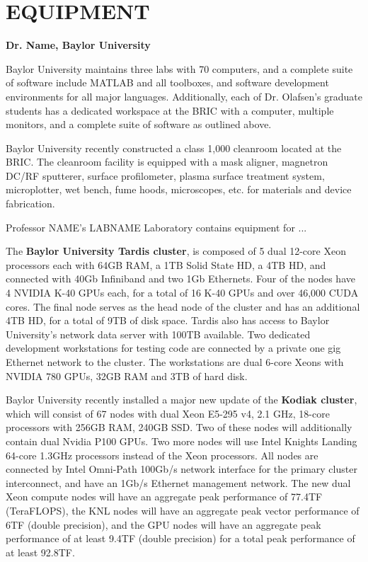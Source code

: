 \section*{EQUIPMENT}



\noindent\textbf{Dr. Name, Baylor University}

Baylor University maintains three labs with 70 computers, and a complete suite of software include MATLAB and all toolboxes, and software development environments for all major languages.  Additionally, each of Dr. Olafsen's graduate students has a dedicated workspace at the BRIC with a computer, multiple monitors, and a complete suite of software as outlined above.

Baylor University recently constructed a class 1,000 cleanroom located at the BRIC.  The cleanroom facility is equipped with a mask aligner, magnetron DC/RF sputterer, surface profilometer, plasma surface treatment system, microplotter, wet bench, fume hoods, microscopes, etc. for materials and device fabrication.

Professor NAME's LABNAME Laboratory contains equipment for ...


The \textbf{Baylor University Tardis cluster}, is composed of 5 dual 12-core Xeon processors each with 64GB RAM, a 1TB Solid State HD, a 4TB HD, and connected with 40Gb Infiniband and two 1Gb Ethernets. Four of the nodes have 4 NVIDIA K-40 GPUs each, for a total of 16 K-40 GPUs and over 46,000 CUDA cores. The final node serves as the head node of the cluster and has an additional 4TB HD, for a total of 9TB of disk space. Tardis also has access to Baylor University's network data server with 100TB available.  Two dedicated development workstations for testing code are connected by a private one gig Ethernet network to the cluster. The workstations are dual 6-core Xeons with NVIDIA 780 GPUs, 32GB RAM and 3TB of hard disk.

Baylor University recently installed a major new update of the \textbf{Kodiak cluster}, which will consist of 67 nodes with dual Xeon E5-295 v4, 2.1 GHz, 18-core processors with 256GB RAM, 240GB SSD.  Two of these nodes will additionally contain dual Nvidia P100 GPUs.  Two more nodes will use Intel Knights Landing 64-core 1.3GHz processors instead of the Xeon processors.  All nodes are connected by Intel Omni-Path 100Gb/s network interface for the primary cluster interconnect, and have an 1Gb/s Ethernet management network.   The new dual Xeon compute nodes will have an aggregate peak performance of 77.4TF (TeraFLOPS), the KNL nodes will have an aggregate peak vector performance of 6TF (double precision), and the GPU nodes will have an aggregate peak performance of at least 9.4TF (double precision) for a total peak performance of at least 92.8TF. 